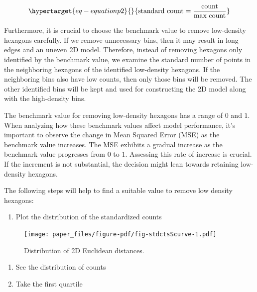 \documentclass[
  12pt]{article}
\providecommand{\tightlist}{%
  \setlength{\itemsep}{0pt}\setlength{\parskip}{0pt}}\usepackage{longtable,booktabs,array}
\begin{document}
\begin{equation}\protect\hypertarget{eq-equationp2}{}{
\text{standard count} = \frac{\text{count}}{\text{max count}} 
}\label{eq-equationp2}\end{equation}

Furthermore, it is crucial to choose the benchmark value to remove
low-density hexagons carefully. If we remove unnecessary bins, then it
may result in long edges and an uneven 2D model. Therefore, instead of
removing hexagons only identified by the benchmark value, we examine the
standard number of points in the neighboring hexagons of the identified
low-density hexagons. If the neighboring bins also have low counts, then
only those bins will be removed. The other identified bins will be kept
and used for constructing the 2D model along with the high-density bins.

The benchmark value for removing low-density hexagons has a range of
\(0\) and \(1\). When analyzing how these benchmark values affect model
performance, it's important to observe the change in Mean Squared Error
(MSE) as the benchmark value increases. The MSE exhibits a gradual
increase as the benchmark value progresses from \(0\) to \(1\).
Assessing this rate of increase is crucial. If the increment is not
substantial, the decision might lean towards retaining low-density
hexagons.

The following steps will help to find a suitable value to remove low
density hexagons:

\begin{enumerate}
\def\labelenumi{\arabic{enumi}.}
\tightlist
\item
  Plot the distribution of the standardized counts
\end{enumerate}

\begin{figure}

{\centering \texttt{[image: paper\_files/figure-pdf/fig-stdctsScurve-1.pdf]}

}

\caption{\label{fig-stdctsScurve}Distribution of 2D Euclidean
distances.}

\end{figure}

\begin{enumerate}
\def\labelenumi{\arabic{enumi}.}
\setcounter{enumi}{1}
\item
  See the distribution of counts
\item
  Take the first quartile
\end{enumerate}
\end{document}
